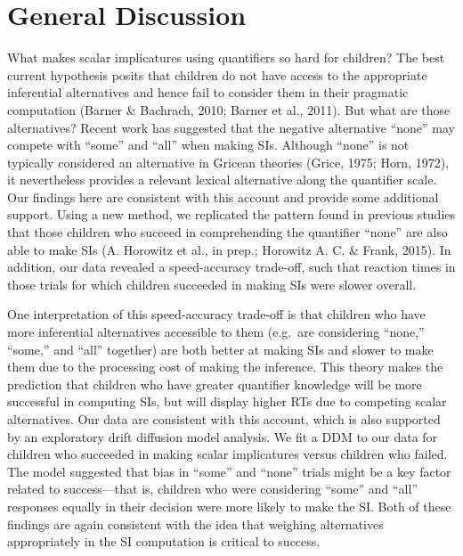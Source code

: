 \documentclass[10pt, letterpaper]{article}
\begin{document}
\section{General Discussion}\label{general-discussion}

What makes scalar implicatures using quantifiers so hard for children?
The best current hypothesis posits that children do not have access to
the appropriate inferential alternatives and hence fail to consider them
in their pragmatic computation (Barner \& Bachrach, 2010; Barner et al.,
2011). But what are those alternatives? Recent work has suggested that
the negative alternative ``none'' may compete with ``some'' and ``all''
when making SIs. Although ``none'' is not typically considered an
alternative in Gricean theories (Grice, 1975; Horn, 1972), it
nevertheless provides a relevant lexical alternative along the
quantifier scale. Our findings here are consistent with this account and
provide some additional support. Using a new method, we replicated the
pattern found in previous studies that those children who succeed in
comprehending the quantifier ``none'' are also able to make SIs (A.
Horowitz et al., in prep.; Horowitz A. C. \& Frank, 2015). In addition,
our data revealed a speed-accuracy trade-off, such that reaction times
in those trials for which children succeeded in making SIs were slower
overall.

One interpretation of this speed-accuracy trade-off is that children who
have more inferential alternatives accessible to them (e.g.~are
considering ``none,'' ``some,'' and ``all'' together) are both better at
making SIs and slower to make them due to the processing cost of making
the inference. This theory makes the prediction that children who have
greater quantifier knowledge will be more successful in computing SIs,
but will display higher RTs due to competing scalar alternatives. Our
data are consistent with this account, which is also supported by an
exploratory drift diffusion model analysis. We fit a DDM to our data for
children who succeeded in making scalar implicatures versus children who
failed. The model suggested that bias in ``some'' and ``none'' trials
might be a key factor related to success---that is, children who were
considering ``some'' and ``all'' responses equally in their decision
were more likely to make the SI. Both of these findings are again
consistent with the idea that weighing alternatives appropriately in the
SI computation is critical to success.
\end{document}
